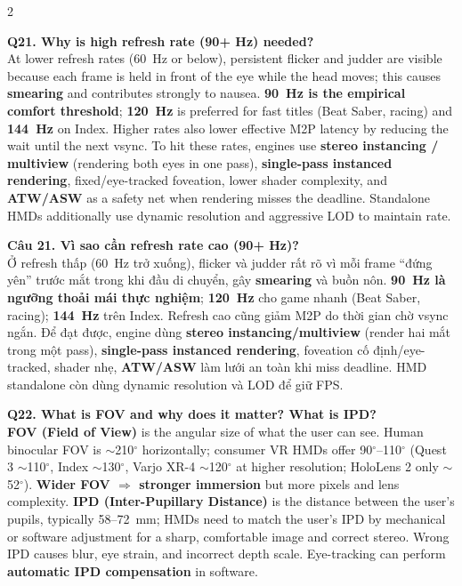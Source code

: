 \begin{paracol}{2}
\switchcolumn*

\textbf{Q21. Why is high refresh rate (90+ Hz) needed?}\\
At lower refresh rates (60~Hz or below), persistent flicker and judder are visible because each frame is held in front of the eye while the head moves; this causes \textbf{smearing} and contributes strongly to nausea. \textbf{90~Hz is the empirical comfort threshold}; \textbf{120~Hz} is preferred for fast titles (Beat Saber, racing) and \textbf{144~Hz} on Index. Higher rates also lower effective M2P latency by reducing the wait until the next vsync. To hit these rates, engines use \textbf{stereo instancing / multiview} (rendering both eyes in one pass), \textbf{single-pass instanced rendering}, fixed/eye-tracked foveation, lower shader complexity, and \textbf{ATW/ASW} as a safety net when rendering misses the deadline. Standalone HMDs additionally use dynamic resolution and aggressive LOD to maintain rate.

\switchcolumn

\textbf{Câu 21. Vì sao cần refresh rate cao (90+ Hz)?}\\
Ở refresh thấp (60~Hz trở xuống), flicker và judder rất rõ vì mỗi frame ``đứng yên'' trước mắt trong khi đầu di chuyển, gây \textbf{smearing} và buồn nôn. \textbf{90~Hz là ngưỡng thoải mái thực nghiệm}; \textbf{120~Hz} cho game nhanh (Beat Saber, racing); \textbf{144~Hz} trên Index. Refresh cao cũng giảm M2P do thời gian chờ vsync ngắn. Để đạt được, engine dùng \textbf{stereo instancing/multiview} (render hai mắt trong một pass), \textbf{single-pass instanced rendering}, foveation cố định/eye-tracked, shader nhẹ, \textbf{ATW/ASW} làm lưới an toàn khi miss deadline. HMD standalone còn dùng dynamic resolution và LOD để giữ FPS.

\switchcolumn*

\textbf{Q22. What is FOV and why does it matter? What is IPD?}\\
\textbf{FOV (Field of View)} is the angular size of what the user can see. Human binocular FOV is $\sim$210$^\circ$ horizontally; consumer VR HMDs offer 90$^\circ$--110$^\circ$ (Quest 3 $\sim$110$^\circ$, Index $\sim$130$^\circ$, Varjo XR-4 $\sim$120$^\circ$ at higher resolution; HoloLens 2 only $\sim$52$^\circ$). \textbf{Wider FOV $\Rightarrow$ stronger immersion} but more pixels and lens complexity. \textbf{IPD (Inter-Pupillary Distance)} is the distance between the user's pupils, typically 58--72~mm; HMDs need to match the user's IPD by mechanical or software adjustment for a sharp, comfortable image and correct stereo. Wrong IPD causes blur, eye strain, and incorrect depth scale. Eye-tracking can perform \textbf{automatic IPD compensation} in software.


\end{paracol}
